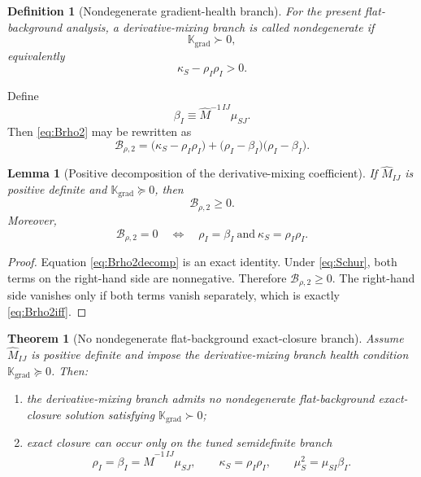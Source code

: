 \documentclass[11pt]{article}
\newtheorem{definition}{Definition}
\newtheorem{lemma}{Lemma}
\newtheorem{theorem}{Theorem}
\begin{document}
\begin{definition}[Nondegenerate gradient-health branch]
For the present flat-background analysis, a derivative-mixing branch is called nondegenerate if
\begin{equation}
\mathbb K_{\mathrm{grad}}\succ 0,
\label{eq:Kstrict}
\end{equation}
equivalently
\begin{equation}
\kappa_S-\rho_I\rho_I>0.
\label{eq:Schurstrict}
\end{equation}
\end{definition}

Define
\begin{equation}
\beta_I \equiv \widehat M^{-1\,IJ}\mu_{SJ}.
\label{eq:beta}
\end{equation}
Then \eqref{eq:Brho2} may be rewritten as
\begin{equation}
\mathcal B_{\rho,2}
=
\bigl(\kappa_S-\rho_I\rho_I\bigr)
+
\bigl(\rho_I-\beta_I\bigr)\bigl(\rho_I-\beta_I\bigr).
\label{eq:Brho2decomp}
\end{equation}

\begin{lemma}[Positive decomposition of the derivative-mixing coefficient]
If \(\widehat M_{IJ}\) is positive definite and \(\mathbb K_{\mathrm{grad}}\succeq 0\), then
\begin{equation}
\mathcal B_{\rho,2}\ge 0.
\label{eq:Brho2positive}
\end{equation}
Moreover,
\begin{equation}
\mathcal B_{\rho,2}=0
\quad\Longleftrightarrow\quad
\rho_I=\beta_I
\ \text{and}\
\kappa_S=\rho_I\rho_I.
\label{eq:Brho2iff}
\end{equation}
\end{lemma}

\begin{proof}
Equation \eqref{eq:Brho2decomp} is an exact identity. Under \eqref{eq:Schur}, both terms on the right-hand side are nonnegative. Therefore \(\mathcal B_{\rho,2}\ge 0\). The right-hand side vanishes only if both terms vanish separately, which is exactly \eqref{eq:Brho2iff}.
\end{proof}

\begin{theorem}[No nondegenerate flat-background exact-closure branch]
Assume \(\widehat M_{IJ}\) is positive definite and impose the derivative-mixing branch health condition \(\mathbb K_{\mathrm{grad}}\succeq 0\). Then:
\begin{enumerate}
    \item the derivative-mixing branch admits no nondegenerate flat-background exact-closure solution satisfying \(\mathbb K_{\mathrm{grad}}\succ 0\);
    \item exact closure can occur only on the tuned semidefinite branch
    \begin{equation}
    \rho_I=\beta_I=\widehat M^{-1\,IJ}\mu_{SJ},
    \qquad
    \kappa_S=\rho_I\rho_I,
    \qquad
    \mu_S^2=\mu_{SI}\beta_I.
    \label{eq:tunedbranch}
    \end{equation}
\end{enumerate}
\end{theorem}
\end{document}

